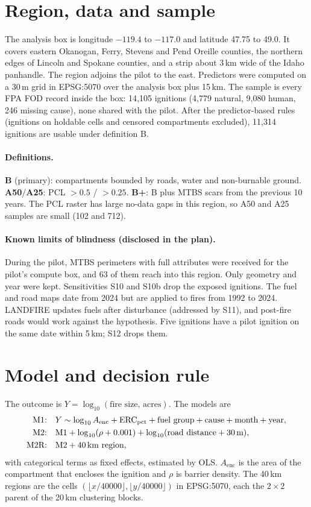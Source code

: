 \documentclass[11pt]{article}
\begin{document}
\section{Region, data and sample}
The analysis box is longitude $-119.4$ to $-117.0$ and latitude 47.75 to 49.0. It covers eastern Okanogan, Ferry, Stevens and Pend Oreille
counties, the northern edges of Lincoln and Spokane counties, and a strip about 3\,km wide of the Idaho panhandle. The region adjoins the pilot
to the east. Predictors were computed on a 30\,m grid in EPSG:5070 over the analysis box plus 15\,km.
The sample is every FPA FOD record inside the box: 14{,}105 ignitions (4{,}779 natural, 9{,}080 human, 246 missing cause),
none shared with the pilot. After the predictor-based rules (ignitions on holdable cells and censored compartments excluded), 11{,}314 ignitions
are usable under definition B.

\paragraph{Definitions.} \textbf{B} (primary): compartments bounded by roads, water and non-burnable ground.
\textbf{A50}/\textbf{A25}: PCL $>0.5$ / $>0.25$. \textbf{B+}: B plus MTBS scars from the previous 10 years.
The PCL raster has large no-data gaps in this region, so A50 and A25 samples are small (102 and 712).

\paragraph{Known limits of blindness (disclosed in the plan).} During the pilot, MTBS perimeters with full attributes were received for
the pilot's compute box, and 63 of them reach into this region. Only geometry and year were kept. Sensitivities S10 and S10b drop the exposed ignitions.
The fuel and road maps date from 2024 but are applied to fires from 1992 to 2024. LANDFIRE updates fuels after disturbance (addressed by S11),
and post-fire roads would work against the hypothesis. Five ignitions have a pilot ignition on the same date within 5\,km; S12 drops them.

\section{Model and decision rule}
The outcome is $Y=\log_{10}(\text{fire size, acres})$. The models are
\begin{align*}
\text{M1:}\quad & Y \sim \log_{10}A_{\text{enc}} + \text{ERC}_{\text{pct}} + \text{fuel group} + \text{cause} + \text{month} + \text{year},\\
\text{M2:}\quad & \text{M1} + \log_{10}(\rho+0.001) + \log_{10}(\text{road distance}+30\,\text{m}),\\
\text{M2R:}\quad & \text{M2} + \text{40\,km region},
\end{align*}
with categorical terms as fixed effects, estimated by OLS. $A_{\text{enc}}$ is the area of the compartment that encloses the ignition and $\rho$ is barrier density.
The 40\,km regions are the cells $(\lfloor x/40000\rfloor,\lfloor y/40000\rfloor)$ in EPSG:5070, each the $2\times2$ parent of the 20\,km
clustering blocks.
\end{document}
